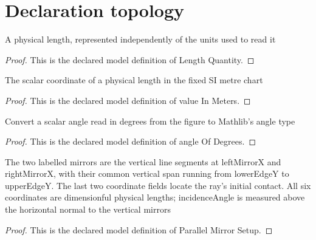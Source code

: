 \section{Declaration topology}
\begin{definition}
  \label{def:physics:phyx-mini-0014:phyxminiproblems-problem0014-lengthquantity}
  A physical length, represented independently of the units used to read it
\end{definition}
\begin{proof}
  This is the declared model definition of Length Quantity.
\end{proof}
\begin{definition}
  \label{def:physics:phyx-mini-0014:phyxminiproblems-problem0014-valueinmeters}
  The scalar coordinate of a physical length in the fixed SI metre chart
\end{definition}
\begin{proof}
  This is the declared model definition of value In Meters.
\end{proof}
\begin{definition}
  \label{def:physics:phyx-mini-0014:phyxminiproblems-problem0014-angleofdegrees}
  Convert a scalar angle read in degrees from the figure to Mathlib's angle type
\end{definition}
\begin{proof}
  This is the declared model definition of angle Of Degrees.
\end{proof}
\begin{definition}
  \label{def:physics:phyx-mini-0014:phyxminiproblems-problem0014-parallelmirrorsetup}
  The two labelled mirrors are the vertical line segments at leftMirrorX and rightMirrorX, with their common vertical span running from lowerEdgeY to upperEdgeY. The last two coordinate fields locate the ray's initial contact. All six coordinates are dimensionful physical lengths; incidenceAngle is measured above the horizontal normal to the vertical mirrors
\end{definition}
\begin{proof}
  This is the declared model definition of Parallel Mirror Setup.
\end{proof}
